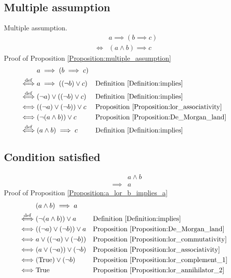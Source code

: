 \subsection{Multiple assumption}
\begin{prop}
\label{Proposition:multiple_assumption}
Multiple assumption.
\begin{align*}
& a \implies (b \implies c) \\
\iff & (a \land b) \implies c
\end{align*}
Proof of Proposition \ref{Proposition:multiple_assumption}
\begin{align*}
& a \implies (b \implies c) \\
\overset{\operatorname{def}}{\iff} & a \implies ((\lnot b) \lor c)
& & \text{Definition \ref{Definition:implies}} \\
\overset{\operatorname{def}}{\iff} & (\lnot a) \lor ((\lnot b) \lor c)
& & \text{Definition \ref{Definition:implies}} \\
\iff & ((\lnot a) \lor (\lnot b)) \lor c
& & \text{Proposition \ref{Proposition:lor_associativity}} \\
\iff & (\lnot (a \land b)) \lor c
& & \text{Proposition \ref{Proposition:De_Morgan_land}} \\
\overset{\operatorname{def}}{\iff} & (a \land b) \implies c
& & \text{Definition \ref{Definition:implies}} \\
\end{align*}
\end{prop}

\subsection{Condition satisfied}
\begin{prop}
\label{Proposition:a_lor_b_implies_a}
\begin{align*}
& a \land b \\
\implies & a
\end{align*}
Proof of Proposition \ref{Proposition:a_lor_b_implies_a}
\begin{align*}
& (a \land b) \implies a \\
\overset{\operatorname{def}}{\iff} & (\lnot (a \land b)) \lor a
& & \text{Definition \ref{Definition:implies}} \\
\iff & ((\lnot a) \lor (\lnot b)) \lor a
& & \text{Proposition \ref{Proposition:De_Morgan_land}} \\
\iff & a \lor ((\lnot a) \lor (\lnot b))
& & \text{Proposition \ref{Proposition:lor_commutativity}} \\
\iff & (a \lor (\lnot a)) \lor (\lnot b)
& & \text{Proposition \ref{Proposition:lor_associativity}} \\
\iff & (\text{True}) \lor (\lnot b)
& & \text{Proposition \ref{Proposition:lor_complement_1}} \\
\iff & \text{True}
& & \text{Proposition \ref{Proposition:lor_annihilator_2}} \\
\end{align*}
\end{prop}

